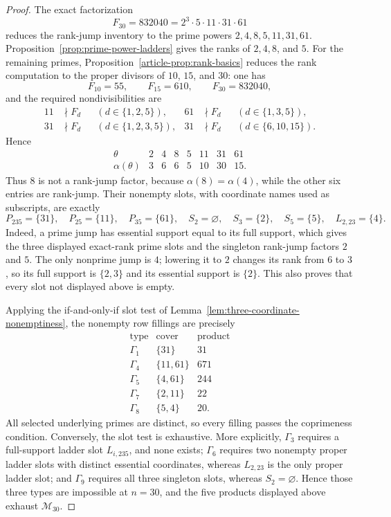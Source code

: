 \begin{proof}
The exact factorization
\[
 F_{30}=832040=2^3\cdot5\cdot11\cdot31\cdot61
\]
reduces the rank-jump inventory to the prime powers
$2,4,8,5,11,31,61$. Proposition~\ref{prop:prime-power-ladders} gives the
ranks of $2,4,8$, and $5$. For the remaining primes,
Proposition~\ref{article-prop:rank-basics} reduces the rank computation to the proper
divisors of $10$, $15$, and $30$: one has
\[
 F_{10}=55,\qquad F_{15}=610,\qquad F_{30}=832040,
\]
and the required nondivisibilities are
\[
\begin{aligned}
11&\nmid F_d &&(d\in\{1,2,5\}),&
61&\nmid F_d &&(d\in\{1,3,5\}),\\
31&\nmid F_d &&(d\in\{1,2,3,5\}),&
31&\nmid F_d &&(d\in\{6,10,15\}).
\end{aligned}
\]
Hence
\[
\begin{array}{c|rrrrrrr}
\theta&2&4&8&5&11&31&61\\ \hline
\alpha(\theta)&3&6&6&5&10&30&15.
\end{array}
\]
Thus $8$ is not a rank-jump factor, because $\alpha(8)=\alpha(4)$, while the other six
entries are rank-jump.  Their nonempty slots, with coordinate names used as
subscripts, are exactly
\[
 P_{235}=\{31\},\quad P_{25}=\{11\},\quad P_{35}=\{61\},
 \quad S_2=\varnothing,\quad S_3=\{2\},\quad S_5=\{5\},
 \quad L_{2,23}=\{4\}.
\]
Indeed, a prime jump has essential support equal to its full support, which
gives the three displayed exact-rank prime slots and the singleton rank-jump factors $2$
and $5$. The only nonprime jump is $4$; lowering it to $2$ changes its rank
from $6$ to $3$, so its full support is $\{2,3\}$ and its essential support
is $\{2\}$.  This also proves that every slot not displayed above is empty.

Applying the if-and-only-if slot test of
Lemma~\ref{lem:three-coordinate-nonemptiness}, the nonempty row fillings are
precisely
\[
\begin{array}{c|c|c}
\text{type}&\text{cover}&\text{product}\\ \hline
\Gamma_1&\{31\}&31\\
\Gamma_4&\{11,61\}&671\\
\Gamma_5&\{4,61\}&244\\
\Gamma_7&\{2,11\}&22\\
\Gamma_8&\{5,4\}&20.
\end{array}
\]
All selected underlying primes are distinct, so every filling passes the
coprimeness condition.  Conversely, the slot test is exhaustive.  More
explicitly, $\Gamma_3$ requires a full-support ladder slot $L_{i,235}$, and
none exists; $\Gamma_6$ requires two nonempty proper ladder slots with
distinct essential coordinates, whereas $L_{2,23}$ is the only proper ladder
slot; and $\Gamma_9$ requires all three singleton slots, whereas
$S_2=\varnothing$.  Hence those three types are impossible at $n=30$, and
the five products displayed above exhaust $\mathcal M_{30}$.
\end{proof}

